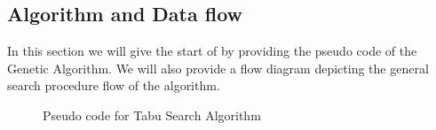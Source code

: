 \subsection{Algorithm and Data flow}
In this section we will give the start of by providing the pseudo code of the Genetic Algorithm. We will also provide a flow diagram depicting the general search procedure flow of the algorithm. 
\begin{figure}[h]
	\centering
	\setlength \fboxsep{0pt}
	\setlength \fboxrule{0.5pt}
	\caption{Pseudo code for Tabu Search Algorithm}
	\label{fig:SAAlgorithmPseudoCode}
\end{figure}

